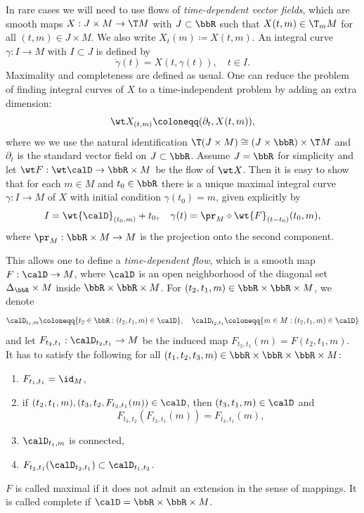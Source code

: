 \begin{rem}
    In rare cases we will need to use flows of \emph{time-dependent vector fields}, which are smooth maps $X:J\times M\to \T M$ with $J\subset\bbR$ such that $X(t,m)\in \T_m M$ for all $(t,m)\in J\times M$. We also write $X_t(m)\coloneqq X(t,m)$. An integral curve $\gamma:I\to M$ with $I\subset J$ is defined by 
    \[\dot\gamma(t)=X(t,\gamma(t)),\quad t\in I.\]
    Maximality and completeness are defined as usual. One can reduce the problem of finding integral curves of $X$ to a time-independent problem by adding an extra dimension:
    \[\wt X_{(t,m)}\coloneqq (\partial_t,X(t,m)),\]
    where we we use the natural identification $\T(J\times M)\cong (J\times\bbR)\times \T M$ and $\partial_t$ is the standard vector field on $J\subset \bbR$. Assume $J=\bbR$ for simplicity and let $\wt F:\wt\calD\to \bbR\times M$ be the flow of $\wt X$. Then it is easy to show that for each $m\in M$ and $t_0\in\bbR$ there is a unique maximal integral curve $\gamma:I\to M$ of $X$ with initial condition $\gamma(t_0)=m$, given explicitly by 
    \[I=\wt{\calD}_{(t_0,m)}+t_0,\quad \gamma(t)=\pr_M\circ \wt{F}_{(t-t_0)}(t_0,m),\]
    where $\pr_M:\bbR\times M\to M$ is the projection onto the second component.
    
    This allows one to define a \emph{time-dependent flow}, which is a smooth map $F:\calD\to M$, where $\calD$ is an open neighborhood of the diagonal set $\Delta_\bbR\times M$ inside $\bbR\times\bbR \times M$.  For $(t_2,t_1,m)\in\bbR\times\bbR\times M$, we denote 
    \[\calD_{t_1,m}\coloneqq \{t_2\in\bbR:(t_2,t_1,m)\in\calD\},\quad \calD_{t_2,t_1}\coloneqq \{m\in M:(t_2,t_1,m)\in\calD\}\]
    and let $F_{t_2,t_1}:\calD_{t_2,t_1}\to M$ be the induced map $F_{t_2,t_1}(m)=F(t_2,t_1,m)$. It has to satisfy the following for all $(t_1,t_2,t_3,m)\in\bbR\times\bbR\times\bbR\times M$:
    \begin{enumerate}
        \item $F_{t_1,t_1}=\id_M$,
        \item if $(t_2,t_1,m),(t_3,t_2,F_{t_2,t_1}(m))\in\calD$, then $(t_3,t_1,m)\in\calD$ and 
        \[F_{t_3,t_2}(F_{t_2,t_1}(m))=F_{t_3,t_1}(m),\]
        \item $\calD_{t_1,m}$ is connected,
        \item $F_{t_2,t_1}(\calD_{t_2,t_1})\subset \calD_{t_1,t_2}$.
    \end{enumerate}
    $F$ is called maximal if it does not admit an extension in the sense of mappings. It is called complete if $\calD=\bbR\times\bbR\times M$. 
    

\end{rem}
